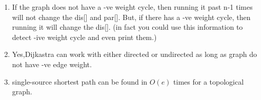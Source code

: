 \begin{exerciseHints}
    \begin{enumerate}
      
    \item If the graph does not have a -ve weight cycle, then running it past n-1 times will not change the dis[] and par[].
    But, if there has a -ve weight cycle, then running it will change the dis[]. (in fact you could use this information to detect -ive weight cycle and even print them.)

    \item Yes,Dijkastra can work with either directed or undirected as long as graph do not have -ve edge weight.
    \item single-source shortest path can be found in $O(e)$ times for a topological graph.
    \end{enumerate}
\end{exerciseHints}